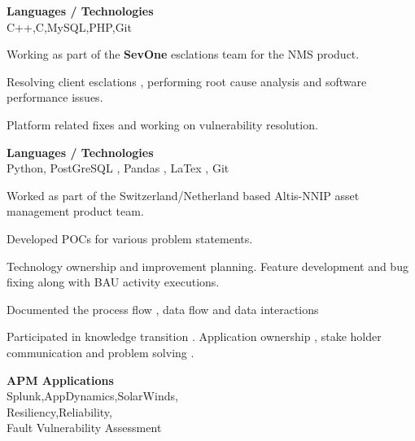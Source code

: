 \documentclass[a4,10pt]{cv4tw}
\begin{document}
            {\textbf{Languages / Technologies} \\C++,C,MySQL,PHP,Git}
            {
                \begin{missions}
                \item Working as part of the \textbf{SevOne} esclations team for the NMS product.
                \item Resolving client esclations , performing root cause analysis and software performance issues.
                \item Platform related fixes and working on vulnerability resolution.
                \end{missions}
                }
                {\textbf{Languages / Technologies} \\Python, PostGreSQL , Pandas , LaTex , Git}
                {
                    \begin{missions}
                    \item Worked as part of the Switzerland/Netherland based Altis-NNIP asset management product team.
                    \item Developed POCs for various problem statements.
                    \item Technology ownership and improvement planning. Feature development and bug fixing along with  BAU activity executions.
                    \item Documented the process flow , data flow and data interactions
                    \item Participated in knowledge transition . Application ownership , stake holder communication and problem solving .
                    \end{missions}
                    }
                    {\textbf{APM Applications}  \\Splunk,AppDynamics,SolarWinds,\\Resiliency,Reliability,\\Fault Vulnerability Assessment}
\end{document}
